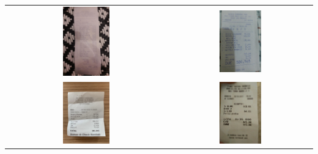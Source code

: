 \begin{table}[htbp]
    \centering
    \begin{tabular}{cc}
        \includegraphics[width=0.3\textwidth]{images/contoh-data/struk-1.jpg} & \includegraphics[width=0.3\textwidth]{images/contoh-data/struk-2.jpg} \\
        \vspace{1cm}
        \includegraphics[width=0.3\textwidth]{images/contoh-data/struk-3.jpg} & \includegraphics[width=0.3\textwidth]{images/contoh-data/struk-4.jpg} \\
    \end{tabular}
\end{table}